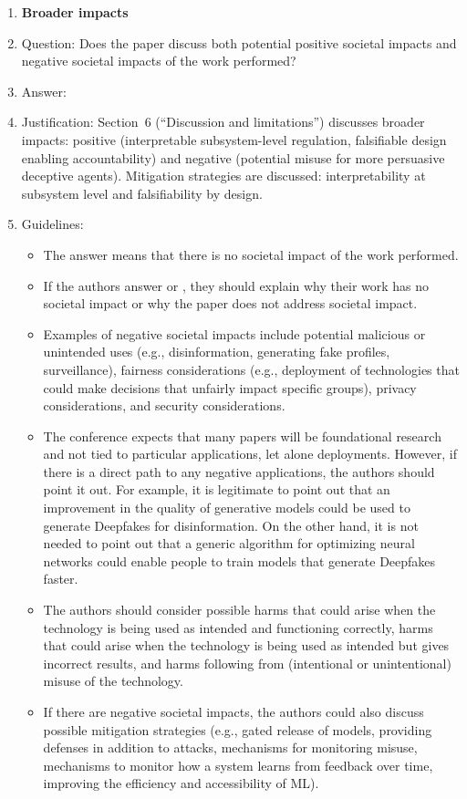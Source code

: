 \begin{enumerate}
\item {\bf Broader impacts}
    \item[] Question: Does the paper discuss both potential positive societal impacts and negative societal impacts of the work performed?
    \item[] Answer: \answerYes{}
    \item[] Justification: Section~6 (``Discussion and limitations'') discusses broader impacts: positive (interpretable subsystem-level regulation, falsifiable design enabling accountability) and negative (potential misuse for more persuasive deceptive agents). Mitigation strategies are discussed: interpretability at subsystem level and falsifiability by design.
    \item[] Guidelines:
    \begin{itemize}
        \item The answer \answerNA{} means that there is no societal impact of the work performed.
        \item If the authors answer \answerNA{} or \answerNo, they should explain why their work has no societal impact or why the paper does not address societal impact.
        \item Examples of negative societal impacts include potential malicious or unintended uses (e.g., disinformation, generating fake profiles, surveillance), fairness considerations (e.g., deployment of technologies that could make decisions that unfairly impact specific groups), privacy considerations, and security considerations.
        \item The conference expects that many papers will be foundational research and not tied to particular applications, let alone deployments. However, if there is a direct path to any negative applications, the authors should point it out. For example, it is legitimate to point out that an improvement in the quality of generative models could be used to generate Deepfakes for disinformation. On the other hand, it is not needed to point out that a generic algorithm for optimizing neural networks could enable people to train models that generate Deepfakes faster.
        \item The authors should consider possible harms that could arise when the technology is being used as intended and functioning correctly, harms that could arise when the technology is being used as intended but gives incorrect results, and harms following from (intentional or unintentional) misuse of the technology.
        \item If there are negative societal impacts, the authors could also discuss possible mitigation strategies (e.g., gated release of models, providing defenses in addition to attacks, mechanisms for monitoring misuse, mechanisms to monitor how a system learns from feedback over time, improving the efficiency and accessibility of ML).
    \end{itemize}
    

\end{enumerate}
